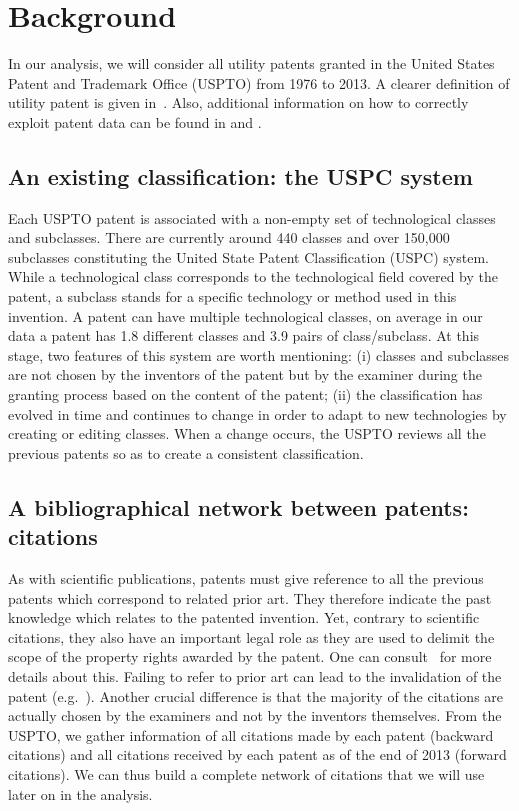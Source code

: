 \documentclass[12pt,twoside,a4paper]{article}
\begin{document}
\section{Background \label{data}}

In our analysis, we will consider all utility patents granted in the United States Patent and Trademark Office (USPTO) from 1976 to 2013. A clearer definition of utility patent is given in~. Also, additional information on how to correctly exploit patent data can be found in \cite{Hall2001} and \cite{lerner2015use}.

\subsection{An existing classification: the USPC system}

Each USPTO patent is associated with a non-empty set of technological classes and subclasses. There are currently around 440 classes and over 150,000 subclasses constituting the United State Patent Classification (USPC) system. While a technological class corresponds to the technological field covered by the patent, a subclass stands for a specific technology or method used in this invention. A patent can have multiple technological classes, on average in our data a patent has 1.8 different classes and 3.9 pairs of class/subclass. At this stage, two features of this system are worth mentioning: (i) classes and subclasses are not chosen by the inventors of the patent but by the examiner during the granting process based on the content of the patent; (ii) the classification has evolved in time and continues to change in order to adapt to new technologies by creating or editing classes. When a change occurs, the USPTO reviews all the previous patents so as to create a consistent classification.

\subsection{A bibliographical network between patents: citations \label{sub:citation}}

As with scientific publications, patents must give reference to all the previous patents which correspond to related prior art. They therefore indicate the past knowledge which relates to the patented invention. Yet, contrary to scientific citations, they also have an important legal role as they are used to delimit the scope of the property rights awarded by the patent. One can consult~\cite{oecdpatentmanual} for more details about this. Failing to refer to prior art can lead to the invalidation of the patent (e.g.~\cite{martin2015}). Another crucial difference is that the majority of the citations are actually chosen by the  examiners and not by the inventors themselves. 
From the USPTO, we gather information of all citations made by each patent (backward citations) and all citations received by each patent as of the end of 2013 (forward citations). We can thus build a complete network of citations that we will use later on in the analysis.
\end{document}
